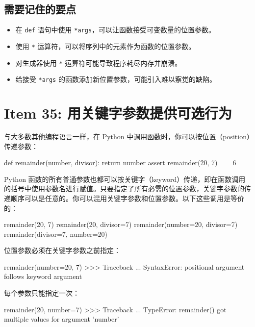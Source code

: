 \subsection{需要记住的要点}

\begin{itemize}
\item 在 \texttt{def} 语句中使用 \texttt{*args}，可以让函数接受可变数量的位置参数。
\item 使用 \texttt{*} 运算符，可以将序列中的元素作为函数的位置参数。
\item 对生成器使用 \texttt{*} 运算符可能导致程序耗尽内存并崩溃。
\item 给接受 \texttt{*args} 的函数添加新位置参数，可能引入难以察觉的缺陷。
\end{itemize}

\section{Item 35: 用关键字参数提供可选行为}

与大多数其他编程语言一样，在 Python 中调用函数时，你可以按位置（position）传递参数：

\begin{codebox}[python]
def remainder(number, divisor):
    return number %
assert remainder(20, 7) == 6
\end{codebox}

Python 函数的所有普通参数也都可以按关键字（keyword）传递，即在函数调用的括号中使用参数名进行赋值。只要指定了所有必需的位置参数，关键字参数的传递顺序可以是任意的。你可以混用关键字参数和位置参数。以下这些调用是等价的：

\begin{codebox}[python]
remainder(20, 7)
remainder(20, divisor=7)
remainder(number=20, divisor=7)
remainder(divisor=7, number=20)
\end{codebox}

位置参数必须在关键字参数之前指定：

\begin{codebox}[python]
remainder(number=20, 7)
>>>
Traceback ...
SyntaxError: positional argument follows keyword argument
\end{codebox}

每个参数只能指定一次：

\begin{codebox}[python]
remainder(20, number=7)
>>>
Traceback ...
TypeError: remainder() got multiple values for argument
'number'
\end{codebox}

